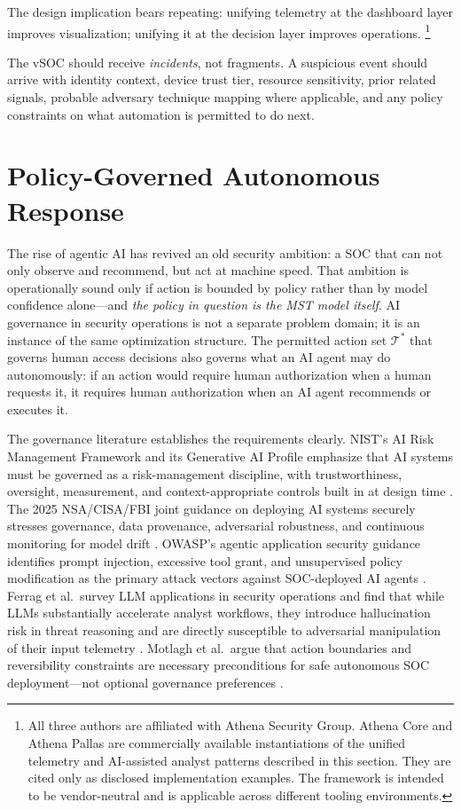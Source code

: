 \documentclass[unnumsec,webpdf,contemporary,large]{oup-authoring-template}
\theoremstyle{thmstyleone}
\theoremstyle{thmstyletwo}
\theoremstyle{thmstylethree}
\begin{document}
The design implication bears repeating: unifying telemetry at the dashboard layer
improves visualization; unifying it at the decision layer improves operations.%
\footnote{All three authors are affiliated with Athena Security Group. Athena Core
\cite{athenacore2026} and Athena Pallas \cite{athenapallas2026} are commercially
available instantiations of the unified telemetry and AI-assisted analyst patterns
described in this section. They are cited only as disclosed implementation examples.
The framework is intended to be vendor-neutral and is applicable across different
tooling environments.}

The vSOC should receive \textit{incidents}, not fragments. A suspicious event should
arrive with identity context, device trust tier, resource sensitivity, prior related
signals, probable adversary technique mapping where applicable, and any policy constraints
on what automation is permitted to do next.

\section{Policy-Governed Autonomous Response}

The rise of agentic AI has revived an old security ambition: a SOC that can not only
observe and recommend, but act at machine speed. That ambition is operationally sound
only if action is bounded by policy rather than by model confidence alone---and
\textit{the policy in question is the MST model itself}. AI governance in security
operations is not a separate problem domain; it is an instance of the same
optimization structure. The permitted action set $\mathcal{T}^{*}$ that governs
human access decisions also governs what an AI agent may do autonomously: if an
action would require human authorization when a human requests it, it requires human
authorization when an AI agent recommends or executes it.

The governance literature establishes the requirements clearly. NIST's AI Risk
Management Framework and its Generative AI Profile emphasize that AI systems must
be governed as a risk-management discipline, with trustworthiness, oversight,
measurement, and context-appropriate controls built in at design time
\cite{tabassi2023, autio2024}. The 2025 NSA/CISA/FBI joint guidance on deploying
AI systems securely stresses governance, data provenance, adversarial robustness,
and continuous monitoring for model drift \cite{nsa2024, aidatasec2025}. OWASP's
agentic application security guidance identifies prompt injection, excessive tool
grant, and unsupervised policy modification as the primary attack vectors against
SOC-deployed AI agents \cite{owasp2025}. Ferrag et al.\ survey LLM applications in
security operations and find that while LLMs substantially accelerate analyst
workflows, they introduce hallucination risk in threat reasoning and are directly
susceptible to adversarial manipulation of their input telemetry \cite{ferrag2025}.
Motlagh et al.\ argue that action boundaries and reversibility constraints are
necessary preconditions for safe autonomous SOC deployment---not optional governance
preferences \cite{motlagh2024}.
\end{document}
